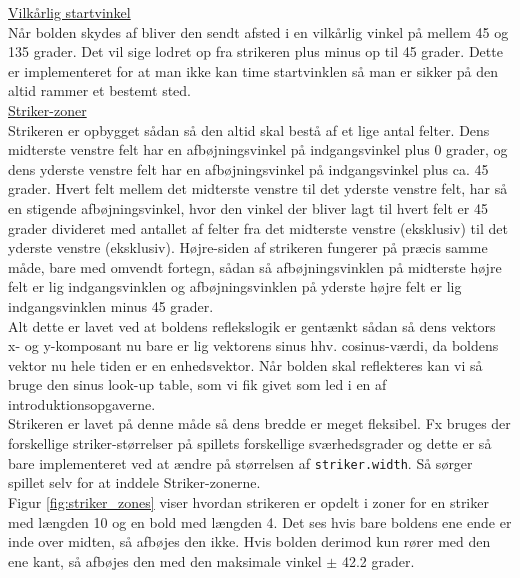 \underline{Vilkårlig startvinkel}\\

Når bolden skydes af bliver den sendt afsted i en vilkårlig vinkel på mellem 45 og 135 grader. Det vil sige lodret op fra strikeren plus minus op til 45 grader. Dette er implementeret for at man ikke kan time startvinklen så man er sikker på den altid rammer et bestemt sted.\\

\underline{Striker-zoner}\\

Strikeren er opbygget sådan så den altid skal bestå af et lige antal felter. Dens midterste venstre felt har en afbøjningsvinkel på indgangsvinkel plus 0 grader, og dens yderste venstre felt har en afbøjningsvinkel på indgangsvinkel plus ca. 45 grader. Hvert felt mellem det midterste venstre til det yderste venstre felt, har så en stigende afbøjningsvinkel, hvor den vinkel der bliver lagt til hvert felt er 45 grader divideret med antallet af felter fra det midterste venstre (eksklusiv) til det yderste venstre (eksklusiv). Højre-siden af strikeren fungerer på præcis samme måde, bare med omvendt fortegn, sådan så afbøjningsvinklen på midterste højre felt er lig indgangsvinklen og afbøjningsvinklen på yderste højre felt er lig indgangsvinklen minus 45 grader.\\
Alt dette er lavet ved at boldens reflekslogik er gentænkt sådan så dens vektors x- og y-komposant nu bare  er lig vektorens sinus hhv. cosinus-værdi, da boldens vektor nu hele tiden er en enhedsvektor. Når bolden skal reflekteres kan vi så bruge  den sinus look-up table, som vi fik givet som led i en af introduktionsopgaverne.\\

Strikeren er lavet på denne måde så dens bredde er meget fleksibel. Fx bruges der forskellige striker-størrelser på spillets forskellige sværhedsgrader og dette er så bare implementeret ved at ændre på størrelsen af \texttt{striker.width}. Så sørger spillet selv for at inddele Striker-zonerne. \\

Figur \ref{fig:striker_zones} viser hvordan strikeren er opdelt i zoner for en striker med længden 10 og en bold med længden 4. Det ses hvis bare boldens ene ende er inde over midten, så afbøjes den ikke. Hvis bolden derimod kun rører med den ene kant, så afbøjes den med den maksimale vinkel $\pm$ 42.2 grader.

